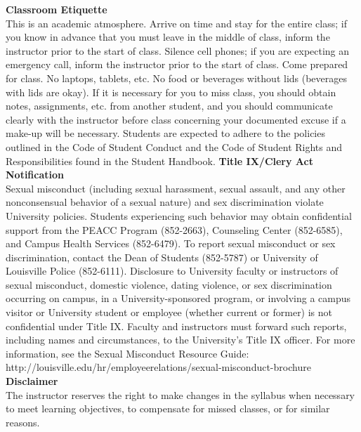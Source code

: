 \documentclass[addpoints,12pt]{exam}
\begin{document}
\wl
\noindent \textbf{Classroom Etiquette} \\
This is an academic atmosphere. Arrive on time and stay for the entire class; if you know in advance that you must leave in the middle of class, inform the instructor prior to the start of class. Silence cell phones; if you are expecting an emergency call, inform the instructor prior to the start of class. Come prepared for class. No laptops, tablets, etc. No food or beverages without lids (beverages with lids are okay). If it is necessary for you to miss class, you should obtain notes, assignments, etc. from another student, and you should communicate clearly with the instructor before class concerning your documented excuse if a make-up will be necessary. Students are expected to adhere to the policies outlined in the Code of Student Conduct and the Code of Student Rights and Responsibilities found in the Student Handbook.
\wl
\noindent \textbf{Title IX/Clery Act Notification} \\
Sexual misconduct (including sexual harassment, sexual assault, and any other nonconsensual behavior of a sexual nature) and sex discrimination violate University policies. Students experiencing such behavior may obtain confidential support from the PEACC Program (852-2663), Counseling Center (852-6585), and Campus Health Services (852-6479). To report sexual misconduct or sex discrimination, contact the Dean of Students (852-5787) or University of Louisville Police (852-6111). Disclosure to University faculty or instructors of sexual misconduct, domestic violence, dating violence, or sex discrimination occurring on campus, in a University-sponsored program, or involving a campus visitor or University student or employee (whether current or former) is not confidential under Title IX. Faculty and instructors must forward such reports, including names and circumstances, to the University's Title IX officer.
For more information, see the Sexual Misconduct Resource Guide:
http://louisville.edu/hr/employeerelations/sexual-misconduct-brochure
\wl
\noindent \textbf{Disclaimer} \\
The instructor reserves the right to make changes in the syllabus when necessary to meet learning objectives, to compensate for missed classes, or for similar reasons.
\newpage
\end{document}
